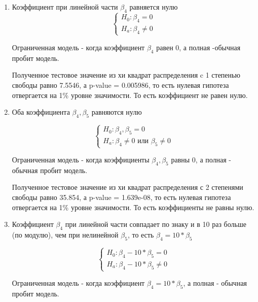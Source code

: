 \documentclass[a4paper,12pt]{article}
\begin{document}
		\begin{enumerate}
		\item Коэффициент при линейной части $\beta_4$ равняется нулю 
			\begin{equation*}
				\begin{cases}
					H_0: \beta_4 = 0\\
					H_a: \beta_4 \ne 0
				\end{cases}
			\end{equation*}		
		
		Ограниченная модель - когда коэффициент $\beta_4$ равен 0, а полная -обычная пробит модель. 
		
		Полученное тестовое значение из хи квадрат распределения c 1 степенью свободы равно 7.5546, а p-value = 0.005986, то есть нулевая гипотеза отвергается на 1\% уровне значимости. То есть коэффициент не равен нулю.
		
		\item Оба коэффициента $\beta_4, \beta_5$ равняются нулю 
		
			\begin{equation*}
			\begin{cases}
				H_0:\beta_4, \beta_5 = 0\\
				H_a: \beta_4 \ne 0 \text{ или } \beta_5 \ne 0
			\end{cases}
		\end{equation*}		
		
		Ограниченная модель - когда коэффициенты $\beta_4, \beta_5$ равны 0, а полная - обычная пробит модель. 
		
		Полученное тестовое значение из хи квадрат распределения с 2 степенями свободы равно 35.854, а p-value = 1.639e-08, то есть нулевая гипотеза отвергается на 1\% уровне значимости. То есть коэффициенты не равны нулю.

	\item Коэффициент $\beta_4$ при линейной части совпадает по знаку и в 10 раз больше (по модулю), чем при нелинейной $\beta_5$, то есть $\beta_4=10*\beta_5$
 
	\begin{equation*}
		\begin{cases}
			H_0:\beta_4-10*\beta_5=0\\
			H_a: \beta_4-10*\beta_5 \ne 0
		\end{cases}
	\end{equation*}		
	
	Ограниченная модель - когда коэффициент $\beta_4=10*\beta_5$, а полная - обычная пробит модель. 
	

\end{enumerate}
\end{document}
